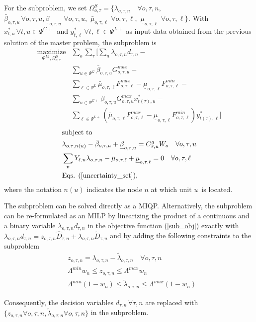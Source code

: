 For the subproblem, we set $\Omega^{S}_{o, \tau} = \{ \lambda_{o, \tau, n} \quad \forall o, \tau, n, $ $\bar{\beta}_{o, \tau, u} \, \forall o, \tau, u, \underline{\beta}_{o, \tau, u} \,\, \forall o, \tau, u, \,\, \bar{\mu}_{o, \tau, \ell} \,\, \forall o, \tau, \ell, \,\, \underline{\mu}_{o, \tau, \ell} \,\, \forall o, \tau, \ell \}$. With $x_{t, u}^* \, \forall t, u \in \Psi^{G+}$ and $y_{t, \ell}^* \, \forall t, \ell \in \Psi^{L+}$ as input data obtained from the previous solution of the master problem, the subproblem is
\begin{align}
\label{sub_obj} \underset{\Phi^{L2}, \Omega_{o, \tau}^{S}}{\text{maximize}} &\sum\limits_o \sum\limits_{\tau} \Bigg[ \sum\limits_n \lambda_{o, \tau, n} d_{\tau, n} - \nonumber \\
&\sum\limits_{u \in \Psi^G} \bar{\beta}_{o, \tau, u} G_{o, \tau, u}^{max} - \nonumber \\
&\sum\limits_{\ell \in \Psi^L} \bar{\mu}_{o, \tau, \ell} F_{o, \tau, \ell}^{max} - \underline{\mu}_{o, \tau, \ell} F_{o, \tau, \ell}^{min} - \nonumber \\
&\sum\limits_{u \in \Psi^{G+}} \bar{\beta}_{o, \tau, u} G_{o, \tau, u}^{max} x_{t(\tau), u}^* - \nonumber \\
&\sum\limits_{\ell \in \Psi^{L+}} \left( \bar{\mu}_{o, \tau, \ell} F_{o, \tau, \ell}^{max} - \underline{\mu}_{o, \tau, \ell} F_{o, \tau, \ell}^{min} \right) y_{t(\tau), \ell}^* \Bigg]
\end{align}
\begin{align}
&\text{subject to} \nonumber \\
&\lambda_{o, \tau, n(u)} - \bar{\beta}_{o, \tau, u} + \underline{\beta}_{o, \tau, u} = C^g_{\tau, u}  W_o \quad \forall o, \tau, u \\
&\sum\limits_n Y_{\ell, n} \lambda_{o, \tau, n} - \bar{\mu}_{o, \tau, \ell} + \underline{\mu}_{o, \tau, \ell} = 0 \quad \forall o, \tau, \ell \\
&\text{Eqs. } (\ref{uncertainty_set}),
\end{align}
where the notation $n(u)$ indicates the node $n$ at which unit $u$ is located.

The subproblem can be solved directly as a MIQP. Alternatively, the subproblem can be re-formulated as an MILP by linearizing the product of a continuous and a binary variable $\lambda_{o, \tau, n} d_{\tau, n}$ in the objective function (\ref{sub_obj}) exactly with $\lambda_{o, \tau, n} d_{\tau, n} = z_{o, \tau, n} \hat{D}_{\tau, n} + \lambda_{o, \tau, n} \tilde{D}_{\tau, n}$ and by adding the following constraints to the subproblem
\begin{align}
&z_{o, \tau, n} = \lambda_{o, \tau, n} - \tilde{\lambda}_{o, \tau, n} \quad \forall o, \tau, n \\
&\Lambda^{min} w_n \leq z_{o, \tau, n} \leq \Lambda^{max} w_n \\
&\Lambda^{min} (1 - w_n) \leq \tilde{\lambda}_{o, \tau, n} \leq \Lambda^{max} (1 - w_n)
\end{align}

Consequently, the decision variables $d_{\tau, n} \, \forall \tau, n$ are replaced with $\{ z_{o, \tau, n} \forall o, \tau, n, \tilde{\lambda}_{o, \tau, n} \forall o, \tau, n \}$ in the subproblem.
